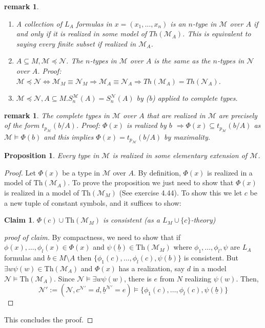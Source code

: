\documentclass[letterpaper, 12pt]{article}
\newcommand{\fin}{\qquad \quad \hfill \framebox[1.75mm][l]{\,}}
\newcommand{\cM}{\mathcal{M}}
\newcommand{\cN}{\mathcal{N}}
\newcommand{\Th}{\mbox{Th}}
\theoremstyle{stdthm}
\newtheorem{prop}[thm]{Proposition}
\theoremstyle{stddef}
\newtheorem{rem}[thm]{remark} %
\theoremstyle{stdnonum}
\newtheorem{claim}{Claim}
\theoremstyle{stdqands}
\theoremstyle{stdbold}
\begin{document}
\begin{rem}
\begin{enumerate}
\item A collection of $L_A$  formulas in $x = (x_1,\dots, x_n)$ is an $n$-type in $\cM$ over $A$ if and only if it is realized in \emph{some} model of $Th(\cM_A)$. This is equivalent to saying every finite subset if realized in $\cM_A$. 
\item $A \subseteq M, \cM \preceq \cN$. The $n$-types in $\cM$ over $A$ is the same as the $n$-types in $\cN$ over $A$. Proof: $\cM \preceq \cN \Leftrightarrow \cM_M \equiv \cN_M \Rightarrow \cM_A \equiv \cN_A \Rightarrow Th(\cM_A) = Th(\cN_A)$. 
\item $\cM \preceq \cN, A \subseteq M. S_n^\cM (A) = S_n^{\cN}(A)$ by (b) applied to complete types. 
\end{enumerate}
\end{rem}



\begin{rem}
The complete types in $\cM$ over $A$ that are realized in $\cM$ are precisely of the form $t_{p_{\cM}}(b/A)$. Proof: $\Phi(x)$ is realized by $b$ $\Rightarrow \Phi(x) \subseteq t_{p_\cM}(b/A)$ as $\cM \models \Phi(b)$ and this implies $\Phi(x) = t_{p_\cM}(b/A)$ by maximality.  
\end{rem}

\begin{prop}
Every type in $\cM$ is realized in some elementary extension of $\cM$.
\end{prop}
\begin{proof}
Let $\Phi(x)$ be a type in $\cM$ over $A$. By definition, $\Phi(x)$ is realized in a model of $\Th(\cM_A)$. To prove the proposition we just need to show that $\Phi(x)$ is realized in a model of $\Th(\cM_M)$ (See exercise 4.44). To show this we let $c$ be a new tuple of constant symbols, and it suffices to show:

\begin{claim}
$\Phi(c) \cup \Th(\cM_M)$ is consistent (as a $L_M \cup \{c\}$-theory)
\end{claim}

\begin{proof}[proof of claim]
By compactness, we need to show that if $\phi(x), \dots, \phi_l(x) \in \Phi(x)$ and $\psi(\underline{b}) \in \Th(\cM_M)$ where $\phi_1, \dots, \phi_l,\psi$ are $L_A$ formulas and $b \in M \setminus A$ then $\{\phi_1(c), \dots, \phi_l(c), \psi(b)\}$ is consistent. But $\exists w \psi(w) \in \Th(\cM_A)$ and $\Phi(x)$ has a realization, say $d$ in a model $\cN \models \Th(\cM_A)$. Since $\cN \models \exists w \psi(w)$, there is $e$ from $N$ realizing $\psi(w)$. Then, 
\[ \cN' := (\cN, c^{\cN'} = d, \underline{b}^{\cN'}= e) \models \{\phi_1(c),\dots, \phi_l(c), \psi(\underline{b}) \} \]
\end{proof}
This concludes the proof.
\end{proof}
\end{document}
